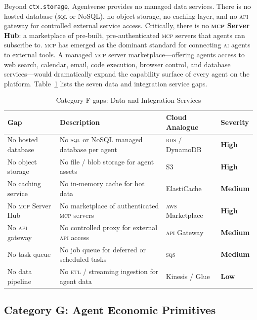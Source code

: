 \documentclass[twoside,11pt]{article}
\newcommand{\high}{\textcolor{red!70!black}{\textbf{High}}}
\newcommand{\medium}{\textcolor{orange!80!black}{\textbf{Medium}}}
\newcommand{\low}{\textcolor{green!50!black}{\textbf{Low}}}
\begin{document}
Beyond \texttt{ctx.storage}, Agentverse provides no managed data services.
There is no hosted database (\textsc{sql} or NoSQL), no object storage, no
caching layer, and no \textsc{api} gateway for controlled external service
access.  Critically, there is no \textbf{\textsc{mcp} Server Hub}: a
marketplace of pre-built, pre-authenticated \textsc{mcp} servers that agents
can subscribe to.  \textsc{mcp} has emerged as the dominant standard for
connecting \textsc{ai} agents to external tools.  A managed \textsc{mcp} server
marketplace---offering agents access to web search, calendar, email, code
execution, browser control, and database services---would dramatically expand
the capability surface of every agent on the platform.
Table~\ref{tab:gap-data} lists the seven data and integration service gaps.

\begin{table}[htbp]
\centering
\caption{Category F gaps: Data and Integration Services}
\label{tab:gap-data}
\begin{tabular}{>{\raggedright\arraybackslash}p{3.2cm} >{\raggedright\arraybackslash}p{5.5cm} >{\raggedright\arraybackslash}p{2.9cm} l}
\toprule
\textbf{Gap} & \textbf{Description} & \textbf{Cloud Analogue} &
\textbf{Severity} \\
\midrule
No hosted database & No \textsc{sql} or NoSQL managed database per agent &
\textsc{rds} / DynamoDB & \high \\
No object storage & No file / blob storage for agent assets & S3 & \high \\
No caching service & No in-memory cache for hot data & ElastiCache & \medium \\
No \textsc{mcp} Server Hub & No marketplace of authenticated \textsc{mcp}
servers & \textsc{aws} Marketplace & \high \\
No \textsc{api} gateway & No controlled proxy for external \textsc{api} access &
\textsc{api} Gateway & \medium \\
No task queue & No job queue for deferred or scheduled tasks & \textsc{sqs} &
\medium \\
No data pipeline & No \textsc{etl} / streaming ingestion for agent data &
Kinesis / Glue & \low \\
\bottomrule
\end{tabular}
\end{table}

\subsection{Category G: Agent Economic Primitives}
\label{subsec:gap-economy}
\end{document}
